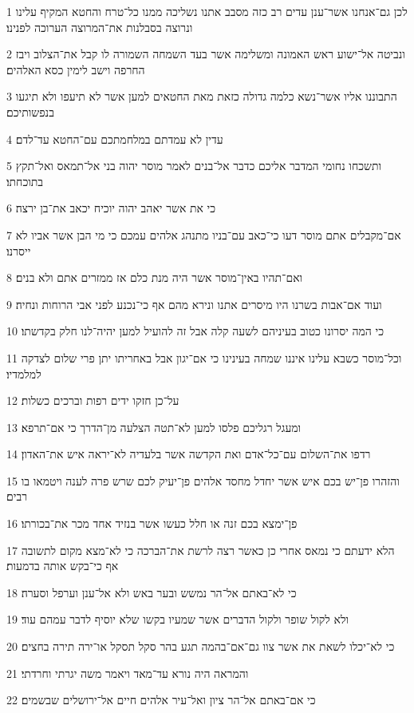 \par 1 לכן גם־אנחנו אשר־ענן עדים רב כזה מסבב אתנו נשליכה ממנו כל־טרח והחטא המקיף עלינו ונרוצה בסבלנות את־המרוצה הערוכה לפנינו׃
\par 2 ונביטה אל־ישוע ראש האמונה ומשלימה אשר בעד השמחה השמורה לו קבל את־הצלוב ויבז החרפה וישב לימין כסא האלהים׃
\par 3 התבוננו אליו אשר־נשא כלמה גדולה כזאת מאת החטאים למען אשר לא תיעפו ולא תיגעו בנפשותיכם׃
\par 4 עדין לא עמדתם במלחמתכם עם־החטא עד־לדם׃
\par 5 ותשכחו נחומי המדבר אליכם כדבר אל־בנים לאמר מוסר יהוה בני אל־תמאס ואל־תקץ בתוכחתו׃
\par 6 כי את אשר יאהב יהוה יוכיח יכאב את־בן ירצה׃
\par 7 אם־מקבלים אתם מוסר דעו כי־כאב עם־בניו מתנהג אלהים עמכם כי מי הבן אשר אביו לא ייסרנו׃
\par 8 ואם־תהיו באין־מוסר אשר היה מנת כלם אז ממזרים אתם ולא בנים׃
\par 9 ועוד אם־אבות בשרנו היו מיסרים אתנו ונירא מהם אף כי־נכנע לפני אבי הרוחות ונחיה׃
\par 10 כי המה יסרונו כטוב בעיניהם לשעה קלה אבל זה להועיל למען יהיה־לנו חלק בקדשתו׃
\par 11 וכל־מוסר כשבא עלינו איננו שמחה בעינינו כי אם־יגון אבל באחריתו יתן פרי שלום לצדקה למלמדיו׃
\par 12 על־כן חזקו ידים רפות וברכים כשלות׃
\par 13 ומעגל רגליכם פלסו למען לא־תטה הצלעה מן־הדרך כי אם־תרפא׃
\par 14 רדפו את־השלום עם־כל־אדם ואת הקדשה אשר בלעדיה לא־יראה איש את־האדון׃
\par 15 והזהרו פן־יש בכם איש אשר יחדל מחסד אלהים פן־יעיק לכם שרש פרה לענה ויטמאו בו רבים׃
\par 16 פן־ימצא בכם זנה או חלל כעשו אשר בנזיד אחד מכר את־בכורתו׃
\par 17 הלא ידעתם כי נמאס אחרי כן כאשר רצה לרשת את־הברכה כי לא־מצא מקום לתשובה אף כי־בקש אותה בדמעות׃
\par 18 כי לא־באתם אל־הר נמשש ובער באש ולא אל־ענן וערפל וסערה׃
\par 19 ולא לקול שופר ולקול הדברים אשר שמעיו בקשו שלא יוסיף לדבר עמהם עוד׃
\par 20 כי לא־יכלו לשאת את אשר צוו גם־אם־בהמה תגע בהר סקל תסקל או־ירה תירה בחצים׃
\par 21 והמראה היה נורא עד־מאד ויאמר משה יגרתי וחרדתי׃
\par 22 כי אם־באתם אל־הר ציון ואל־עיר אלהים חיים אל־ירושלים שבשמים׃
